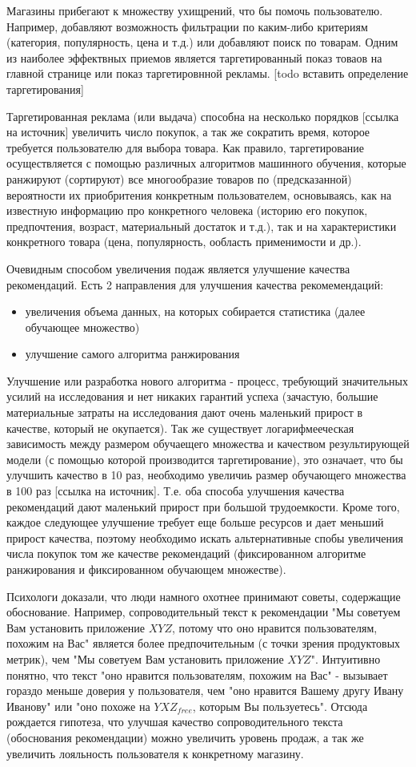\documentclass[12pt,a4paper]{report}
\begin{document}
Магазины прибегают к множеству ухищрений, что бы помочь пользователю. Например, добавляют возможность фильтрации по каким-либо критериям (категория, популярность, цена и т.д.) или добавляют поиск по товарам. Одним из наиболее эффектвных приемов является таргетированный показ товаов на главной странице или показ таргетировнной рекламы. [todo вставить определение таргетирования]

Таргетированная реклама (или выдача) способна на несколько порядков [ссылка на источник] увеличить число покупок, а так же сократить время, которое требуется пользователю для выбора товара.
Как правило, таргетирование осуществляется с помощью различных алгоритмов машинного обучения, которые ранжируют (сортируют) все многообразие товаров по (предсказанной) вероятности их приобритения конкретным пользователем, основываясь, как на известную информацию про конкретного человека (историю его покупок, предпочтения, возраст, материальный достаток и т.д.), так и на характеристики конкретного товара (цена, популярность, ообласть применимости и др.).

Очевидным способом увеличения подаж является улучшение качества рекомендаций. Есть 2 направления для улучшения качества рекомемендаций:
\begin{itemize}
\item увеличения объема данных, на которых собирается статистика (далее обучающее множество)
\item улучшение самого алгоритма ранжирования
\end{itemize}

Улучшение или разработка нового алгоритма - процесс, требующий значительных усилий на исследования и нет никаких гарантий успеха (зачастую, большие материальные затраты на исследования дают очень маленький прирост в качестве, который не окупается). Так же существует логарифмееческая зависимость между размером обучаещего множества и качеством результирующей модели (с помощью которой производится таргетирование), это означает, что бы улучшить качество в 10 раз, необходимо увеличиь размер обучающего множества в 100 раз [ссылка на источник]. Т.е. оба способа улучшения качества рекомендаций дают маленький прирост при большой трудоемкости.
Кроме того, каждое следующее улучшение требует еще больше ресурсов и дает меньший прирост качества, поэтому необходимо искать альтернативные спобы увеличения числа покупок том же качестве рекомендаций (фиксированном алгоритме ранжирования и фиксированном обучающем множестве).

Психологи доказали, что люди намного охотнее принимают советы, содержащие обоснование. Например, сопроводительный текст к рекомендации "Мы советуем Вам установить приложение $XYZ$, потому что оно нравится пользователям, похожим на Вас" является более предпочительным (с точки зрения продуктовых метрик), чем "Мы советуем Вам установить приложение $XYZ$". Интуитивно понятно, что текст "оно нравится пользователям, похожим на Вас" - вызывает гораздо меньше доверия у пользователя, чем "оно нравится Вашему другу Ивану Иванову" или "оно похоже на $YXZ_{free}$, которым Вы пользуетесь". Отсюда рождается гипотеза, что улучшая качество сопроводительного текста (обоснования рекомендации) можно увеличить уровень продаж, а так же увеличить лояльность пользователя к конкретному магазину.
\end{document}
